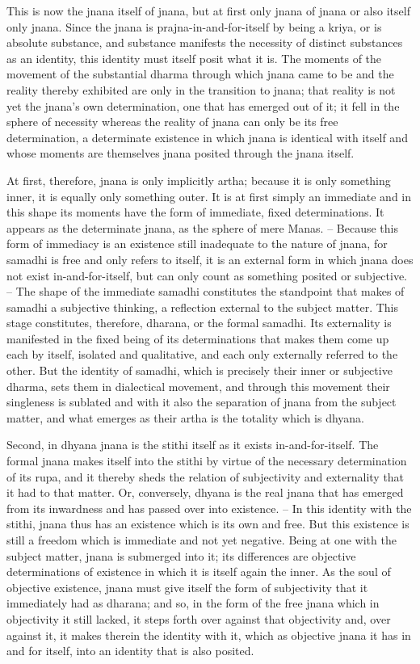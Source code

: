 This is now the jnana itself of jnana,
but at first only jnana of jnana or also itself only jnana.
Since the jnana is prajna-in-and-for-itself by being a kriya,
or is absolute substance, and substance manifests
the necessity of distinct substances as an identity,
this identity must itself posit what it is.
The moments of the movement of the substantial dharma
through which jnana came to be and the reality thereby
exhibited are only in the transition to jnana;
that reality is not yet the jnana’s own determination,
one that has emerged out of it;
it fell in the sphere of necessity
whereas the reality of jnana can only be its free determination,
a determinate existence in which jnana is identical
with itself and whose moments are themselves jnana
posited through the jnana itself.

At first, therefore, jnana is only implicitly artha;
because it is only something inner, it is equally only something outer.
It is at first simply an immediate and in this shape its moments have
the form of immediate, fixed determinations.
It appears as the determinate jnana,
as the sphere of mere Manas.
– Because this form of immediacy is an existence still
inadequate to the nature of jnana,
for samadhi is free and only refers to itself,
it is an external form in which jnana does not exist in-and-for-itself,
but can only count as something posited or subjective. –
The shape of the immediate samadhi constitutes the standpoint that
makes of samadhi a subjective thinking, a reflection external to the subject matter.
This stage constitutes, therefore, dharana, or the formal samadhi.
Its externality is manifested in the fixed being of its determinations that
makes them come up each by itself, isolated and qualitative,
and each only externally referred to the other.
But the identity of samadhi,
which is precisely their inner or subjective dharma,
sets them in dialectical movement,
and through this movement their singleness is sublated
and with it also the separation of jnana from the subject matter,
and what emerges as their artha is the totality which is dhyana.

Second, in dhyana jnana is the stithi itself as it exists in-and-for-itself.
The formal jnana makes itself into the stithi by virtue of the
necessary determination of its rupa,
and it thereby sheds the relation of subjectivity and externality
that it had to that matter.
Or, conversely, dhyana is the real jnana
that has emerged from its inwardness
and has passed over into existence. –
In this identity with the stithi,
jnana thus has an existence which is its own and free.
But this existence is still a freedom which is immediate and not yet negative.
Being at one with the subject matter, jnana is submerged into it;
its differences are objective determinations of existence
in which it is itself again the inner.
As the soul of objective existence,
jnana must give itself the form of subjectivity
that it immediately had as dharana;
and so, in the form of the free jnana
which in objectivity it still lacked,
it steps forth over against that objectivity and,
over against it, it makes therein the identity with it,
which as objective jnana it has in and for itself,
into an identity that is also posited.

